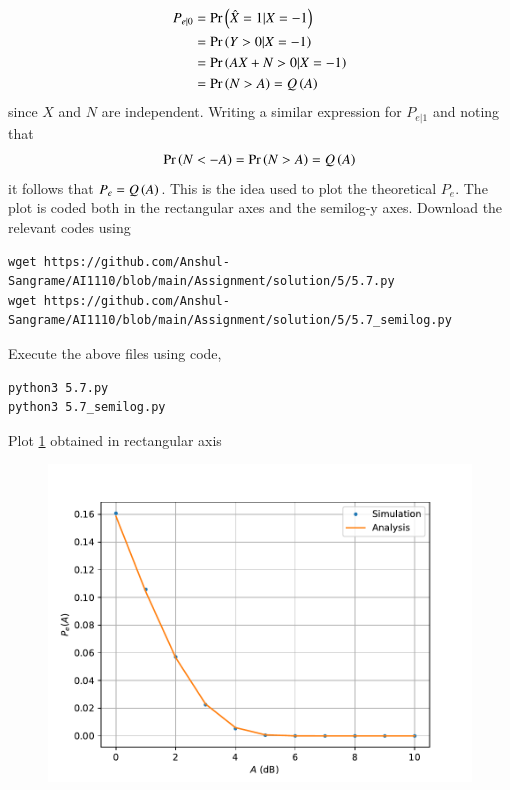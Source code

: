 \documentclass[journal,12pt,twocolumn]{IEEEtran}
\renewcommand\thesection{\arabic{section}}
\begin{document}
\begin{enumerate}[label=\thesection.\arabic*
,ref=\thesection.\theenumi]
\begin{align}
	P_{e|0} &= \Pr\left(\hat{X} = 1 | X = -1\right)\\
	&= \Pr\left(Y > 0 | X = -1\right) \\
	&= \Pr\left(AX + N > 0 | X = -1\right) \label{eq:thresh} \\
	&= \Pr\left(N > A\right) = Q\left(A\right)
\end{align}
since $X$ and $N$ are independent. Writing a similar expression for $P_{e|1}$ and noting that 
\begin{align}
	\Pr\left(N < -A\right) = \Pr\left(N > A\right) = Q\left(A\right)
\end{align}
it follows that $P_e = Q\left(A\right)$. This is the idea used to plot the theoretical $P_e$. The plot is coded both in the rectangular axes and the semilog-y axes. Download the relevant codes using 
\begin{lstlisting}
wget https://github.com/Anshul-Sangrame/AI1110/blob/main/Assignment/solution/5/5.7.py
wget https://github.com/Anshul-Sangrame/AI1110/blob/main/Assignment/solution/5/5.7_semilog.py
\end{lstlisting}
Execute the above files using code,
\begin{lstlisting}
python3 5.7.py
python3 5.7_semilog.py
\end{lstlisting}
Plot \ref{fig:5.7} obtained in rectangular axis
\begin{figure}[!ht]
    \centering
    \includegraphics[width=\columnwidth]{../figs/5_6.pdf}
    \caption{}
    \label{fig:5.7}
\end{figure}


\end{enumerate}
\end{document}

